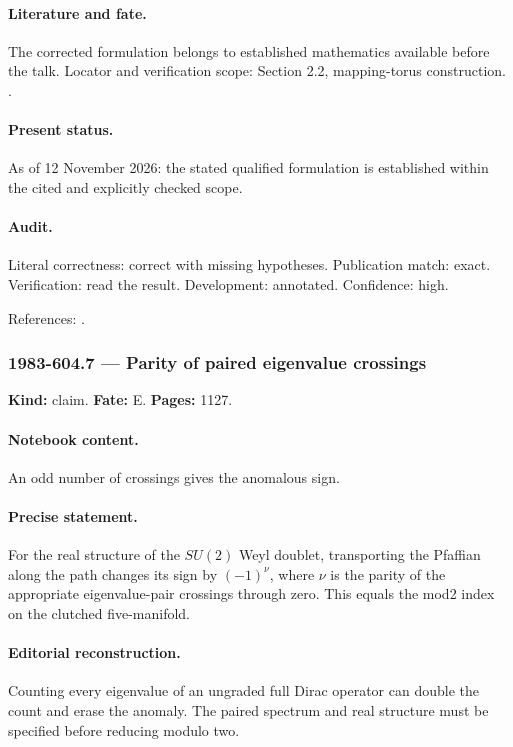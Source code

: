 \paragraph{Literature and fate.} The corrected formulation belongs to established mathematics available before the talk. Locator and verification scope: Section 2.2, mapping-torus construction. \cite{wangwenwitten2019new}.

\paragraph{Present status.} As of 12 November 2026: the stated qualified formulation is established within the cited and explicitly checked scope.

\paragraph{Audit.} Literal correctness: correct with missing hypotheses. Publication match: exact. Verification: read the result. Development: annotated. Confidence: high.

\noindent References: \citep{wangwenwitten2019new}.\par

\subsubsection{1983-604.7 --- Parity of paired eigenvalue crossings}

\label{item:1983-604.7}

\noindent\textbf{Kind:} claim. \textbf{Fate:} E. \textbf{Pages:} 1127.\par

\paragraph{Notebook content.} An odd number of crossings gives the anomalous sign.

\paragraph{Precise statement.} For the real structure of the \(SU(2)\) Weyl doublet, transporting the Pfaffian along the path changes its sign by \((-1)^\nu\), where \(\nu\) is the parity of the appropriate eigenvalue-pair crossings through zero. This equals the mod2 index on the clutched five-manifold.

\paragraph{Editorial reconstruction.} Counting every eigenvalue of an ungraded full Dirac operator can double the count and erase the anomaly. The paired spectrum and real structure must be specified before reducing modulo two.

